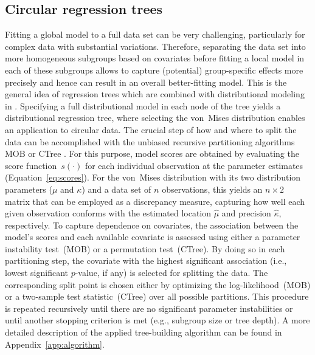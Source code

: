 \documentclass{statsoc}
\begin{document}
\subsection{Circular regression trees}
\label{sec:circtree}
Fitting a global model to a full data set can be very challenging, particularly
for complex data with substantial variations. Therefore, separating the data
set into more homogeneous subgroups based on covariates before fitting a local
model in each of these subgroups allows to capture (potential) group-specific
effects more precisely and hence can result in an overall better-fitting model.
This is the general idea of regression trees which are combined with
distributional modeling in \cite{Schlosser+Hothorn+Stauffer:2019}. Specifying a
full distributional model in each node of the tree yields a distributional
regression tree, where selecting the von~Mises distribution enables an
application to circular data. The crucial step of how and where to split the
data can be accomplished with the unbiased recursive partitioning algorithms
MOB \citep{Zeileis+Hothorn+Hornik:2008} or CTree
\citep{Hothorn+Hornik+Zeileis:2006}. For this purpose, model scores are
obtained by evaluating the score function~$s(\cdot)$ for each individual
observation at the parameter estimates (Equation~\ref{eq:scores}). For the
von~Mises distribution with its two distribution parameters ($\mu$ and
$\kappa$) and a data set of $n$ observations, this yields an $n \times 2$
matrix that can be employed as a discrepancy measure, capturing how well each
given observation conforms with the estimated location $\hat{\mu}$ and
precision $\hat{\kappa}$, respectively. To capture dependence on covariates,
the association between the model's scores and each available covariate is
assessed using either a parameter instability test~(MOB) or a permutation
test~(CTree). By doing so in each partitioning step, the covariate with the
highest significant association (i.e., lowest significant $p$-value, if any) is
selected for splitting the data. The corresponding split point is chosen either
by optimizing the log-likelihood~(MOB) or a two-sample test statistic~(CTree)
over all possible partitions. This procedure is repeated recursively until
there are no significant parameter instabilities or until another stopping
criterion is met (e.g., subgroup size or tree depth). A more detailed
description of the applied tree-building algorithm can be found in
Appendix~\ref{app:algorithm}.
\end{document}
